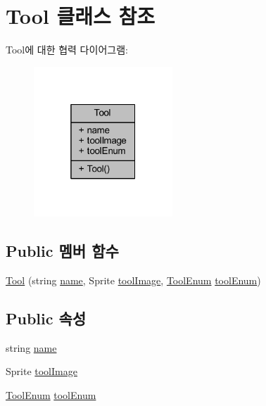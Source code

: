 \hypertarget{class_tool}{}\section{Tool 클래스 참조}
\label{class_tool}


Tool에 대한 협력 다이어그램\+:\nopagebreak
\begin{figure}[H]
\begin{center}
\leavevmode
\includegraphics[width=148pt]{de/d9e/class_tool__coll__graph}
\end{center}
\end{figure}
\subsection*{Public 멤버 함수}
\begin{DoxyCompactItemize}
\item 
\mbox{\hyperlink{class_tool_a0b70a9dc1f9bc934267fbe22051e81a8}{Tool}} (string \mbox{\hyperlink{class_tool_ae98511e0d3cb8d545901b16d7862ec5b}{name}}, Sprite \mbox{\hyperlink{class_tool_a219661f916e81a5de0411c1beda81d54}{tool\+Image}}, \mbox{\hyperlink{_tool__legacy_8cs_a47994263d1ab331c1e5d3e7ac555271a}{Tool\+Enum}} \mbox{\hyperlink{class_tool_aeaecfc422da3961b77f3023ed4e99651}{tool\+Enum}})
\end{DoxyCompactItemize}
\subsection*{Public 속성}
\begin{DoxyCompactItemize}
\item 
string \mbox{\hyperlink{class_tool_ae98511e0d3cb8d545901b16d7862ec5b}{name}}
\item 
Sprite \mbox{\hyperlink{class_tool_a219661f916e81a5de0411c1beda81d54}{tool\+Image}}
\item 
\mbox{\hyperlink{_tool__legacy_8cs_a47994263d1ab331c1e5d3e7ac555271a}{Tool\+Enum}} \mbox{\hyperlink{class_tool_aeaecfc422da3961b77f3023ed4e99651}{tool\+Enum}}
\end{DoxyCompactItemize}


